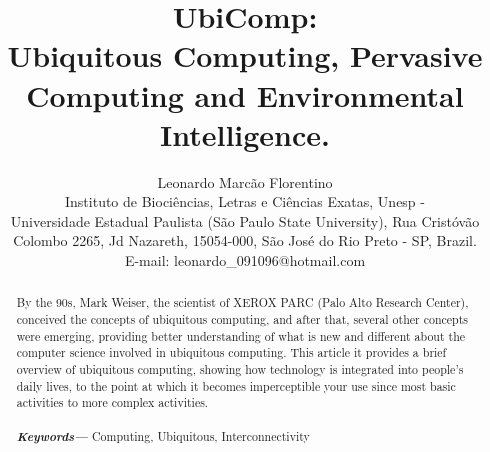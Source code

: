 \documentclass[a4paper,times,12pt]{article}
\begin{document}
\title{UbiComp: \\ Ubiquitous Computing, Pervasive Computing and Environmental Intelligence.}
\author{Leonardo Marc\~{a}o Florentino \\ Instituto de Bioci\^{e}ncias, Letras e Ci\^{e}ncias Exatas, Unesp - \\ Universidade Estadual Paulista (S\~{a}o Paulo State University), Rua Crist\'{o}v\~{a}o \\ Colombo 2265, Jd Nazareth, 15054-000, S\~{a}o Jos\'{e} do Rio Preto - SP, Brazil. \\ E-mail: leonardo\_091096@hotmail.com}
\providecommand{\keywords}[1]{\textbf{\textit{Keywords---}} #1}
\maketitle
\begin{abstract}
By the 90s, Mark Weiser, the scientist of XEROX PARC (Palo Alto Research Center), conceived the concepts of ubiquitous computing, and after that, several other concepts were emerging, providing better understanding of what is new and different about the computer science involved in ubiquitous computing. This article it provides a brief overview of ubiquitous computing, showing how technology is integrated into people's daily lives, to the point at which it becomes imperceptible your use since most basic activities to more complex activities.
\\ \\ \keywords{Computing, Ubiquitous, Interconnectivity}
\end{abstract}
\end{document}

